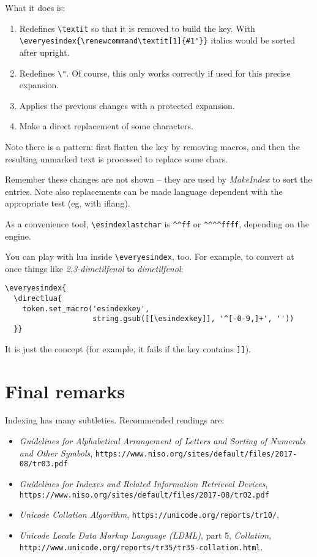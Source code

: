 \documentclass[a4paper]{ltxguide}
\begin{document}
What it does is:
\begin{enumerate}
\item Redefines \verb|\textit| so that it is removed to build the key.
With \verb|\everyesindex{\renewcommand\textit[1]{#1'}}| italics would
be sorted after upright.

\item Redefines \verb|\"|. Of course, this only works correctly if used
for this precise expansion.

\item Applies the previous changes with a protected expansion.

\item Make a direct replacement of some characters.

\end{enumerate}
Note there is a pattern: first flatten the key by removing macros, and
then the resulting unmarked text is processed to replace some chars.

Remember these changes are not shown -- they are used by
\textit{MakeIndex} to sort the entries. Note also replacements can be
made language dependent with the appropriate test (eg, with
\textsf{iflang}).

As a convenience tool, \verb|\esindexlastchar| is \verb|^^ff| or
\verb|^^^^ffff|, depending on the engine.

You can play with \textsf{lua} inside \verb|\everyesindex|, too. For
example, to convert at once things like \textit{2,3-dimetilfenol} to
\textit{dimetilfenol}:
\begin{verbatim}
\everyesindex{
  \directlua{
    token.set_macro('esindexkey',
                    string.gsub([[\esindexkey]], '^[-0-9,]+', ''))
  }}
\end{verbatim}

It is just the concept (for example, it fails if the key contains
\verb|]]|).

\section{Final remarks}

Indexing has many subtleties. Recommended readings are:
\begin{itemize}
  \item \textit{Guidelines for Alphabetical Arrangement of Letters and
  Sorting of Numerals and Other Symbols},
  \verb|https://www.niso.org/sites/default/files/2017-08/tr03.pdf|
  \item \textit{Guidelines for Indexes and Related Information Retrieval
  Devices},
  \verb|https://www.niso.org/sites/default/files/2017-08/tr02.pdf|
  \item \textit{Unicode Collation Algorithm},
  \verb|https://unicode.org/reports/tr10/|,
  \item \textit{Unicode Locale Data Markup Language (LDML)}, part 5,
  \textit{Collation},
  \verb|http://www.unicode.org/reports/tr35/tr35-collation.html|.
\end{itemize}
\end{document}
